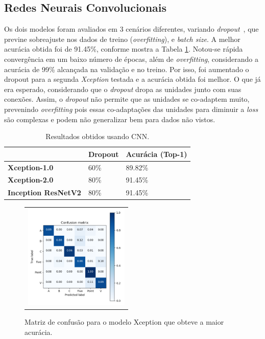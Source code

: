 \documentclass[conference]{IEEEtran}
\begin{document}
\subsection{Redes Neurais Convolucionais}
Os dois modelos foram avaliados em 3 cenários diferentes, variando \textit{dropout}~\cite{dropout}, que previne sobreajuste nos dados de treino (\textit{overfitting}),  e \textit{batch size}. A melhor acurácia obtida foi de 91.45\%, conforme mostra a Tabela \ref{tab:res1}. Notou-se rápida convergência em um baixo número de épocas, além de \textit{overfitting}, considerando a acurácia de 99\% alcançada na validação e no treino. Por isso, foi aumentado o dropout para a segunda \textit{Xception} testada e a acurácia obtida foi melhor. O que já era esperado, considerando que o \textit{dropout} dropa as unidades junto com suas conexões. Assim, o \textit{dropout} não permite que as unidades se co-adaptem muito, prevenindo \textit{overfitting} pois essas
co-adaptações das unidades para diminuir a \textit{loss} são complexas e podem não generalizar bem
para dados não vistos.

\begin{table}[htbp]
\centering
\caption{Resultados obtidos usando CNN.}
\label{tab:res1}
\begin{tabular}{|l|l|l|}
\hline
                            & \textbf{Dropout} & \textbf{Acurácia (Top-1)} \\ \hline
\textbf{Xception-1.0}       & 60\%             & 89.82\%           \\ \hline
\textbf{Xception-2.0}       & 80\%             & 91.45\%           \\ \hline
\textbf{Inception ResNetV2} & 80\%             & 91.45\%           \\ \hline
\end{tabular}
\end{table}

\begin{figure}[htbp]
\begin{center}
\begin{tabular}{c}
	\includegraphics[width=5cm]{figs/confusion_matrix_xception2.png} 
\end{tabular}
\end{center}
\caption{Matriz de confusão para o modelo Xception que obteve a maior acurácia.}
\label{fig:res1}
\end{figure}
\end{document}
